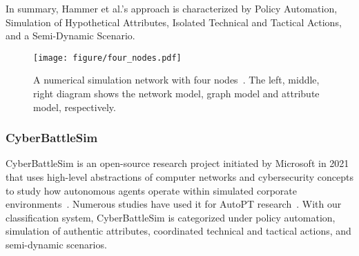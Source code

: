 In summary, Hammer et al.’s approach is characterized by Policy Automation, Simulation of Hypothetical Attributes, Isolated Technical and Tactical Actions, and a Semi-Dynamic Scenario.


\begin{figure}[tb]
    \centering
    \texttt{[image: figure/four\_nodes.pdf]}
    \caption{A numerical simulation network with four nodes~\cite{2020Finding}. The left, middle, right diagram shows the network model, graph model and attribute model, respectively.}
    \label{fig3:four nodes}
\end{figure}



\subsubsection{CyberBattleSim}
CyberBattleSim is an open-source research project initiated by Microsoft in 2021 that uses high-level abstractions of computer networks and cybersecurity concepts to study how autonomous agents operate within simulated corporate environments~\cite{Cyberbattlesim}. Numerous studies have used it for AutoPT research~\cite{li2024knowledge, terranova2024leveraging, zhang2022improved, guo2023automated}. With our classification system, CyberBattleSim is categorized under policy automation, simulation of authentic attributes, coordinated technical and tactical actions, and semi-dynamic scenarios. 

